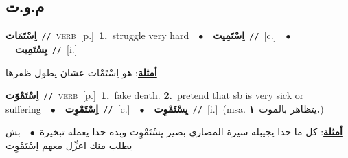 \documentclass[10pt,a4paper,twoside]{article} %
\begin{document}
\begin{multicols}{2}
\vspace{-3mm}
\subsection*{\color{blue}\foreignlanguage{arabic}{م.و.ت}\color{blue}{}} 

{\setlength\topsep{0pt}\textbf{\foreignlanguage{arabic}{اِسْتَمَات}}\ {\color{gray}\texttt{//}\color{black}}\ \textsc{verb}\ [p.]\ \textbf{1.}~struggle very hard\ \ $\bullet$\ \ \setlength\topsep{0pt}\textbf{\foreignlanguage{arabic}{اِسْتَمِيت}}\ {\color{gray}\texttt{//}\color{black}}\ [c.]\ \ $\bullet$\ \ \setlength\topsep{0pt}\textbf{\foreignlanguage{arabic}{يِسْتَمِيت}}\ {\color{gray}\texttt{//}\color{black}}\ [i.]\  \begin{flushright}\color{gray}\foreignlanguage{arabic}{\textbf{\underline{\foreignlanguage{arabic}{أمثلة}}}: هو اِسْتَمْات عشان يطول ظفرها}\end{flushright}\color{black}} \vspace{2mm}

{\setlength\topsep{0pt}\textbf{\foreignlanguage{arabic}{اِسْتَمْوَت}}\ {\color{gray}\texttt{//}\color{black}}\ \textsc{verb}\ [p.]\ \textbf{1.}~fake death.  \textbf{2.}~pretend that sb is very sick or suffering\ \ $\bullet$\ \ \setlength\topsep{0pt}\textbf{\foreignlanguage{arabic}{اِسْتَمْوِت}}\ {\color{gray}\texttt{//}\color{black}}\ [c.]\ \ $\bullet$\ \ \setlength\topsep{0pt}\textbf{\foreignlanguage{arabic}{يِسْتَمْوِت}}\ {\color{gray}\texttt{//}\color{black}}\ [i.]\ \color{gray}(msa. \foreignlanguage{arabic}{يتظاهر بالموت}~\foreignlanguage{arabic}{\textbf{١.}})\color{black}\  \begin{flushright}\color{gray}\foreignlanguage{arabic}{\textbf{\underline{\foreignlanguage{arabic}{أمثلة}}}: كل ما حدا يجيبله سيرة المصاري بصير يِسْتَمْوِت وبده حدا يعمله تبخيرة\ $\bullet$\ \  بش يطلب منك اعزِّل معهم اِسْتَمْوِت}\end{flushright}\color{black}} \vspace{2mm}


\end{multicols}
\end{document}
